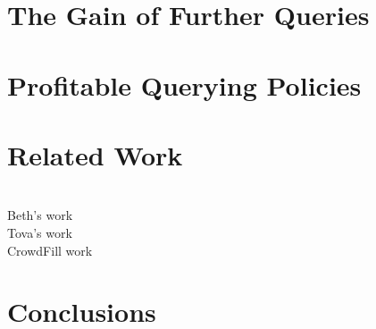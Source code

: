 \documentclass{sig-alternate}
\begin{document}
\subsection{}
\subsection{}

\section{The Gain of Further Queries}

\section{Profitable Querying Policies}

\section{Related Work}

\ \\Beth's work
\ \\Tova's work
\ \\CrowdFill work

\section{Conclusions}




\end{document}
